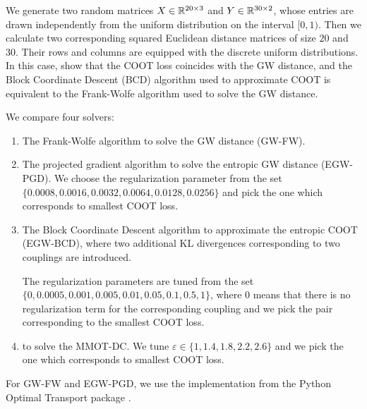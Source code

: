 We generate two random matrices $X \in \mathbb R^{20 \times 3}$ and $Y \in \mathbb R^{30 \times 2}$,
whose entries are drawn independently from the uniform distribution on the interval $[0,1)$. Then we calculate two corresponding
squared Euclidean distance matrices of size $20$ and $30$. Their rows and columns are equipped with the discrete
uniform distributions. In this case, \citet{Redko20} show that the COOT loss coincides with the GW distance, and the
Block Coordinate Descent (BCD) algorithm used to approximate COOT is equivalent to the Frank-Wolfe algorithm \citep{Frank56}
used to solve the GW distance.

We compare four solvers:
\begin{enumerate}
  \item The Frank-Wolfe algorithm to solve the GW distance (GW-FW).

  \item The projected gradient algorithm to solve the entropic GW distance \citep{Peyre16} (EGW-PGD).
  We choose the regularization parameter from the set
  $\{0.0008, 0.0016, 0.0032, 0.0064, 0.0128, 0.0256 \}$
  and pick the one which corresponds to smallest COOT loss.

  \item The Block Coordinate Descent algorithm to approximate the entropic COOT \citep{Redko20}
  (EGW-BCD), where two additional KL divergences corresponding to two couplings are introduced.

  The regularization parameters are tuned from the set
  $\{0, 0.0005, 0.001, 0.005, 0.01, 0.05, 0.1, 0.5, 1 \}$,
  where $0$ means that there is no regularization term for the corresponding coupling
  and we pick the pair corresponding to the smallest COOT loss.

  \item {} to solve the MMOT-DC. We tune
  $\varepsilon \in \{1, 1.4, 1.8, 2.2, 2.6\}$ and we pick the one which corresponds to smallest COOT loss.
\end{enumerate}
For GW-FW and EGW-PGD, we use the implementation from the Python Optimal Transport package \citep{Flamary21}.

